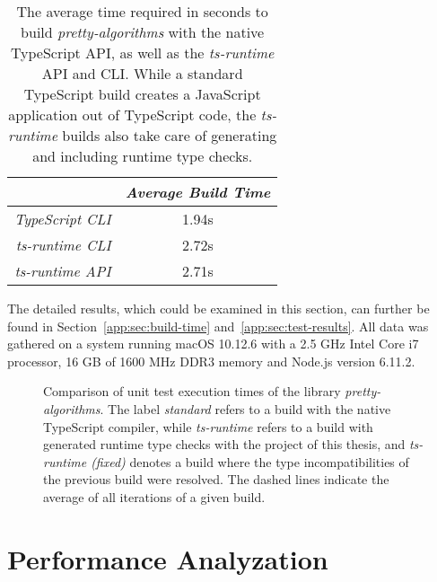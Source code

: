 \begin{table}
\caption{The average time required in seconds to build \emph{pretty-algorithms} with the native TypeScript API, as well as the \emph{ts-runtime} API and CLI. While a standard TypeScript build creates a JavaScript application out of TypeScript code, the \emph{ts-runtime} builds also take care of generating and including runtime type checks.}
\label{tab:build-time}
\centering
\setlength{\tabcolsep}{5mm}
\def\arraystretch{1.25}
\small
\begin{tabular}{|r||c|}
    \hline
    & \emph{Average Build Time} \\
    \hline
    \hline
    \emph{TypeScript CLI} & 1.94s \\
    \hline
    \emph{ts-runtime CLI} & 2.72s \\
    \hline
    \emph{ts-runtime API} & 2.71s \\
    \hline
  \end{tabular}
\end{table}
The detailed results, which could be examined in this section, can further be found in Section~\ref{app:sec:build-time} and~\ref{app:sec:test-results}. All data was gathered on a system running macOS 10.12.6 with a 2.5 GHz Intel Core i7 processor, 16 GB of 1600 MHz DDR3 memory and Node.js version 6.11.2.
\begin{figure}
\centering

\caption{Comparison of unit test execution times of the library \emph{pretty-algorithms}. The label \emph{standard} refers to a build with the native TypeScript compiler, while \emph{ts-runtime} refers to a build with generated runtime type checks with the project of this thesis, and \emph{ts-runtime (fixed)} denotes a build where the type incompatibilities of the previous build were resolved. The dashed lines indicate the average of all iterations of a given build.}
\label{fig:operational-test}
\end{figure}

\section{Performance Analyzation}
\label{sec:performance-analyzation}

